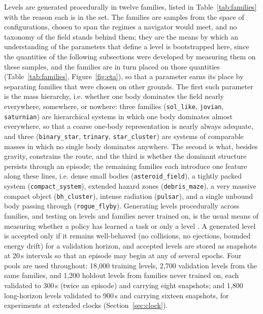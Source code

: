 \documentclass[11pt]{article}
\newcommand{\code}[1]{\texttt{\small #1}}
\begin{document}
Levels are generated procedurally in twelve families, listed in
Table~\ref{tab:families} with the reason each is in the set. The families
are samples from the space of configurations, chosen to span the regimes a
navigator would meet, and no taxonomy of the field stands behind them; they
are the means by which an understanding of the parameters that define a
level is bootstrapped here, since the quantities of the following
subsections were developed by measuring them on these samples, and the
families are in turn placed on those quantities (Table~\ref{tab:families},
Figure~\ref{fig:eta}), so that a parameter earns its place by separating
families that were chosen on other grounds. The first such parameter is the
mass hierarchy, i.e. whether one body dominates the field nearly everywhere,
somewhere, or nowhere: three families (\code{sol\_like}, \code{jovian},
\code{saturnian}) are hierarchical systems in which one body dominates almost
everywhere, so that a coarse one-body representation is nearly always
adequate, and three (\code{binary\_star}, \code{trinary},
\code{star\_cluster}) are systems of comparable masses in which no single
body dominates anywhere. The second is what, besides gravity, constrains the
route, and the third is whether the dominant structure persists through an
episode; the remaining families each introduce one feature along these
lines, i.e. dense small bodies (\code{asteroid\_field}), a tightly packed
system (\code{compact\_system}), extended hazard zones (\code{debris\_maze}),
a very massive compact object (\code{bh\_cluster}), intense radiation
(\code{pulsar}), and a single unbound body passing through
(\code{rogue\_flyby}). Generating levels procedurally across families, and
testing on levels and families never trained on, is the usual means of
measuring whether a policy has learned a task or only a level
\cite{cobbe2019,cobbe2020,justesen2018}. A generated level is accepted only
if it remains well-behaved (no collisions, no ejections, bounded energy
drift) for a validation horizon, and accepted levels are stored as snapshots
at 20\,s intervals so that an episode may begin at any of several epochs.
Four pools are used throughout: 18,000 training levels, 2,700 validation
levels from the same families, and 1,200 holdout levels from families never
trained on, each validated to 300\,s (twice an episode) and carrying eight
snapshots; and 1,800 long-horizon levels validated to 900\,s and carrying
sixteen snapshots, for experiments at extended clocks
(Section~\ref{sec:clock}).
\end{document}

